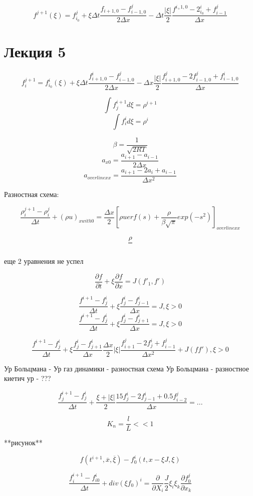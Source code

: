 \documentclass{article}
\begin{document}
\[ f^{j+1} (\xi) = f^j_{i_0} + \xi \Delta t \frac{f_{i+1, 0} - f^j_{i-1, 0}}{2 \Delta x} - \Delta t \frac{|\xi|}{2} \frac{f^{i_+1, 0} - 2^i_{i_0} + f^j_{i-1}}{\Delta x} \]

\section{Лекция 5}

\[ f^{j+1}_{i} = f^i_{i_0 }(\xi) + \xi \Delta t \frac{f^i_{i+1, 0} - f^j_{i-1, 0}}{2 \Delta x} - \Delta x \frac{|\xi|}{2} \frac{f^j_{i+1, 0}-2f^j_{i-1, 0} + f^i_{i-1, 0}}{\Delta x}\]

\[ \int f^{i+1}_j d\xi = \rho^{i+1}\]
\[ \int f^{i}_i d\xi = \rho^{i}\]

\[ \beta = \frac{1}{\sqrt{ 2 R T}} \]
\[ a_{x0} = \frac{a_{i+1} - a_{i-1}}{2 \Delta x} \]
\[ a_{overline{x} x} = \frac{a_{i+1} - 2a_i + a_{i-1}}{\Delta x^2} \]

Разностная схема:

\[ \frac{\rho _i^{j+1} - \rho_i^j}{\Delta t} + (\rho u)_{x with 0} = \frac{\Delta x}{2} [\rho u erf(s) + \frac{\rho}{ \beta \sqrt{\pi} } exp(-s^2)]_{overline x x} \]

\[ \frac{\rho }{} \]

еще 2 уравнения не успел 

\[ \frac{\partial f }{\partial t} + \xi \frac{\partial f }{\partial x} = J({f'}_1, f') \]

\[ \frac{f^{i+1} - f^i_j }{\Delta t} + \xi \frac{ f^i_j - f^i_{j-1}}{\Delta x} = J, \xi > 0\]
\[ \frac{f^{i+1} - f^i_j }{\Delta t} + \xi \frac{ f^i_j - f^i_{j+1}}{\Delta x} = J, \xi > 0\]

\[ \frac{f^{i+1} - f^i_j }{\Delta t} + \xi \frac{ f^i_j - f^i_{j+1}}{\Delta x} \frac{\Delta x }{2} |\xi| \frac{f^j_{i+1} - 2f^i_j + f^j_{i-1}}{\Delta x^2} + J(ff'), \xi > 0\]

Ур Больцмана - Ур газ динамики - разностная схема
Ур Больцмана - разностное киетич ур - ???

\[ \frac{f^{i+1}_j - f^{i}_j}{\Delta t} + \frac{\xi + |\xi| }{2}\frac{15 f^i_j - 2f^i_{j-1} + 0.5 f^j_{i-2}}{\Delta x} = ... \]


\[ K_n = \frac{l}{L} << 1\]

**рисунок**

\[ f(t^{i+1}, \overline{x}, \overline{\xi}) - f_0^i(t, x - \xi J, \xi) \]

\[ \frac{f^{i+1}_i - f^i_{i 0}}{\Delta t } + div (\xi f_0)^i = \frac{\partial}{\partial X_i} \frac{J }{2} \xi_i \xi_k \frac{\partial f^j_0}{\partial x_k} \]
\end{document}
